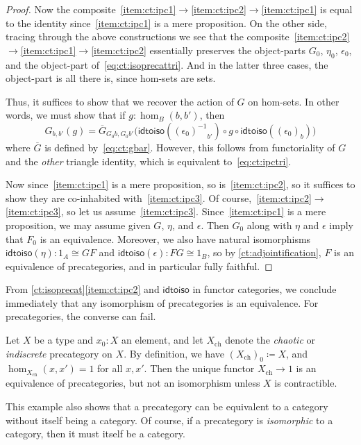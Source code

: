 \documentclass{mscs}
\newcommand{\defeq}{\coloneqq}  %
\newcommand{\opp}[1]{\mathord{{#1}^{-1}}}
\numberwithin{equation}{section}
\newcommand{\idtoiso}{\ensuremath{\mathsf{idtoiso}}\xspace}
\begin{document}
\begin{proof}
  Now the composite~\ref{item:ct:ipc1}$\to$\ref{item:ct:ipc2}$\to$\ref{item:ct:ipc1} is equal to the identity since~\ref{item:ct:ipc1} is a mere proposition.
  On the other side, tracing through the above constructions we see that the composite~\ref{item:ct:ipc2}$\to$\ref{item:ct:ipc1}$\to$\ref{item:ct:ipc2} essentially preserves the object-parts $G_0$, $\eta_0$, $\epsilon_0$, and the object-part of~\eqref{eq:ct:isoprecattri}.
  And in the latter three cases, the object-part is all there is, since hom-sets are sets.

  Thus, it suffices to show that we recover the action of $G$ on hom-sets.
  In other words, we must show that if $g:\hom_B(b,b')$, then
  \[ G_{b,b'}(g) =
  \overline{G}_{G_0b,G_0b'}\Big(\idtoiso(\opp{(\epsilon_0)}_{b'}) \circ g \circ \idtoiso((\epsilon_0)_b)\Big)
  \]
  where $\overline{G}$ is defined by~\eqref{eq:ct:gbar}.
  However, this follows from functoriality of $G$ and the \emph{other} triangle identity, which is equivalent to~\eqref{eq:ct:ipctri}.

  Now since~\ref{item:ct:ipc1} is a mere proposition, so is~\ref{item:ct:ipc2}, so it suffices to show they are co-inhabited with~\ref{item:ct:ipc3}.
  Of course,~\ref{item:ct:ipc2}$\to$\ref{item:ct:ipc3}, so let us assume~\ref{item:ct:ipc3}.
  Since~\ref{item:ct:ipc1} is a mere proposition, we may assume given $G$, $\eta$, and $\epsilon$.
  Then $G_0$ along with $\eta$ and $\epsilon$ imply that $F_0$ is an equivalence.
  Moreover, we also have natural isomorphisms $\idtoiso(\eta):1_A\cong GF$ and $\idtoiso(\epsilon):FG\cong 1_B$, so by \autoref{ct:adjointification}, $F$ is an equivalence of precategories, and in particular fully faithful.
\end{proof}

From \autoref{ct:isoprecat}\ref{item:ct:ipc2} and $\idtoiso$ in functor categories, we conclude immediately that any isomorphism of precategories is an equivalence.
For precategories, the converse can fail.

\begin{eg}\label{ct:chaotic}
  Let $X$ be a type and $x_0:X$ an element, and let $X_{\mathrm{ch}}$ denote the \emph{chaotic} or \emph{indiscrete} precategory on $X$.
  By definition, we have $(X_{\mathrm{ch}})_0\defeq X$, and $\hom_{X_{\mathrm{ch}}}(x,x') = 1$ for all $x,x'$.
  Then the unique functor $X_{\mathrm{ch}}\to 1$ is an equivalence of precategories, but not an isomorphism unless $X$ is contractible.

  This example also shows that a precategory can be equivalent to a category without itself being a category.
  Of course, if a precategory is \emph{isomorphic} to a category, then it must itself be a category.
\end{eg}
\end{document}
